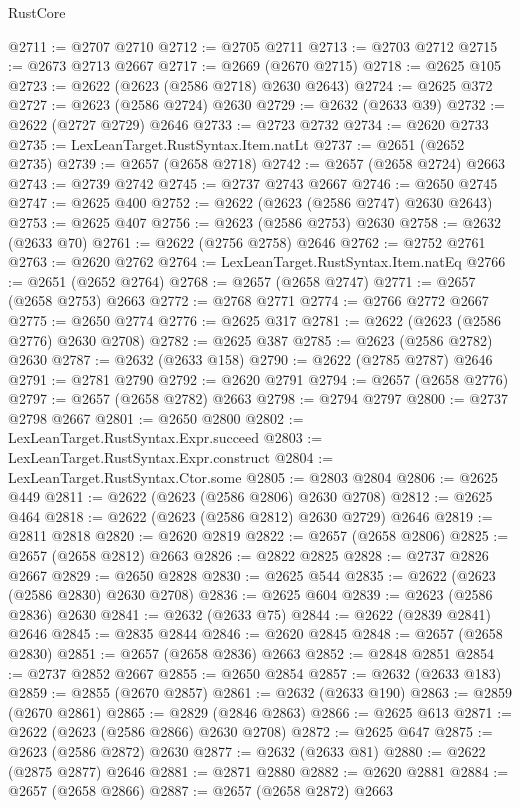 \begin{lexlean}{RustCore}
\begin{coremodule}
@2711 := @2707 @2710
@2712 := @2705 @2711
@2713 := @2703 @2712
@2715 := @2673 @2713 @2667
@2717 := @2669 (@2670 @2715)
@2718 := @2625 @105
@2723 := @2622 (@2623 (@2586 @2718) @2630 @2643)
@2724 := @2625 @372
@2727 := @2623 (@2586 @2724) @2630
@2729 := @2632 (@2633 @39)
@2732 := @2622 (@2727 @2729) @2646
@2733 := @2723 @2732
@2734 := @2620 @2733
@2735 := LexLeanTarget.RustSyntax.Item.natLt
@2737 := @2651 (@2652 @2735)
@2739 := @2657 (@2658 @2718)
@2742 := @2657 (@2658 @2724) @2663
@2743 := @2739 @2742
@2745 := @2737 @2743 @2667
@2746 := @2650 @2745
@2747 := @2625 @400
@2752 := @2622 (@2623 (@2586 @2747) @2630 @2643)
@2753 := @2625 @407
@2756 := @2623 (@2586 @2753) @2630
@2758 := @2632 (@2633 @70)
@2761 := @2622 (@2756 @2758) @2646
@2762 := @2752 @2761
@2763 := @2620 @2762
@2764 := LexLeanTarget.RustSyntax.Item.natEq
@2766 := @2651 (@2652 @2764)
@2768 := @2657 (@2658 @2747)
@2771 := @2657 (@2658 @2753) @2663
@2772 := @2768 @2771
@2774 := @2766 @2772 @2667
@2775 := @2650 @2774
@2776 := @2625 @317
@2781 := @2622 (@2623 (@2586 @2776) @2630 @2708)
@2782 := @2625 @387
@2785 := @2623 (@2586 @2782) @2630
@2787 := @2632 (@2633 @158)
@2790 := @2622 (@2785 @2787) @2646
@2791 := @2781 @2790
@2792 := @2620 @2791
@2794 := @2657 (@2658 @2776)
@2797 := @2657 (@2658 @2782) @2663
@2798 := @2794 @2797
@2800 := @2737 @2798 @2667
@2801 := @2650 @2800
@2802 := LexLeanTarget.RustSyntax.Expr.succeed
@2803 := LexLeanTarget.RustSyntax.Expr.construct
@2804 := LexLeanTarget.RustSyntax.Ctor.some
@2805 := @2803 @2804
@2806 := @2625 @449
@2811 := @2622 (@2623 (@2586 @2806) @2630 @2708)
@2812 := @2625 @464
@2818 := @2622 (@2623 (@2586 @2812) @2630 @2729) @2646
@2819 := @2811 @2818
@2820 := @2620 @2819
@2822 := @2657 (@2658 @2806)
@2825 := @2657 (@2658 @2812) @2663
@2826 := @2822 @2825
@2828 := @2737 @2826 @2667
@2829 := @2650 @2828
@2830 := @2625 @544
@2835 := @2622 (@2623 (@2586 @2830) @2630 @2708)
@2836 := @2625 @604
@2839 := @2623 (@2586 @2836) @2630
@2841 := @2632 (@2633 @75)
@2844 := @2622 (@2839 @2841) @2646
@2845 := @2835 @2844
@2846 := @2620 @2845
@2848 := @2657 (@2658 @2830)
@2851 := @2657 (@2658 @2836) @2663
@2852 := @2848 @2851
@2854 := @2737 @2852 @2667
@2855 := @2650 @2854
@2857 := @2632 (@2633 @183)
@2859 := @2855 (@2670 @2857)
@2861 := @2632 (@2633 @190)
@2863 := @2859 (@2670 @2861)
@2865 := @2829 (@2846 @2863)
@2866 := @2625 @613
@2871 := @2622 (@2623 (@2586 @2866) @2630 @2708)
@2872 := @2625 @647
@2875 := @2623 (@2586 @2872) @2630
@2877 := @2632 (@2633 @81)
@2880 := @2622 (@2875 @2877) @2646
@2881 := @2871 @2880
@2882 := @2620 @2881
@2884 := @2657 (@2658 @2866)
@2887 := @2657 (@2658 @2872) @2663

\end{coremodule}
\end{lexlean}
